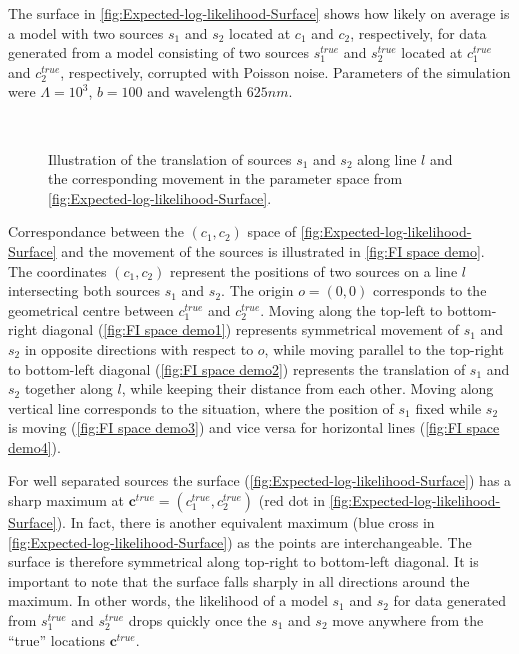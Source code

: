 The surface in \autoref{fig:Expected-log-likelihood-Surface} shows how likely on average is a model with two sources $s_1$ and $s_2$ located at $c_1$ and $c_2$, respectively, for data generated from a model consisting of two sources $s_1^{true}$ and $s_2^{true}$ located at $c_1^{true}$ and $c_2^{true}$, respectively, corrupted with Poisson noise. Parameters of the simulation were $\Lambda=10^3$, $b=100$ and wavelength $625 \unit{nm}$.

\begin{figure}[hb]
	\newcommand{\wf}{.48\textwidth}
	\centering
	 \\
	\caption{Illustration of the translation of sources $s_1$ and $s_2$ along line $l$ and the corresponding movement in the parameter space from \autoref{fig:Expected-log-likelihood-Surface}.}
	\label{fig:FI space demo}
\end{figure}
%
Correspondance between the $(c_1,c_2)$ space of \autoref{fig:Expected-log-likelihood-Surface} and the movement of the sources is illustrated in \autoref{fig:FI space demo}. The coordinates $(c_1,c_2)$ represent the positions of two sources on a line $l$ intersecting both sources $s_1$ and  $s_2$. The origin $o=(0,0)$ corresponds to the geometrical centre between $c_1^{true}$ and $c_2^{true}$. Moving along the top-left to bottom-right diagonal (\autoref{fig:FI space demo1}) represents symmetrical movement of $s_1$ and $s_2$  in opposite directions with respect to $o$, while moving parallel to the top-right to bottom-left diagonal (\autoref{fig:FI space demo2}) represents the translation of $s_1$ and $s_2$ together along $l$, while keeping their distance from each other. Moving along vertical line corresponds to the situation, where the position of $s_1$ fixed while $s_2$ is moving (\autoref{fig:FI space demo3}) and vice versa for horizontal lines (\autoref{fig:FI space demo4}).

For well separated sources the surface (\autoref{fig:Expected-log-likelihood-Surface}\aaa) has a sharp maximum at $\bm{c}^{true}=(c_1^{true},c_2^{true})$ (red dot in \autoref{fig:Expected-log-likelihood-Surface}\aaa). In fact, there is another equivalent maximum (blue cross in \autoref{fig:Expected-log-likelihood-Surface}\aaa) as the points are interchangeable.  The surface is therefore symmetrical along top-right to bottom-left diagonal. It is important to note that the surface falls sharply in all directions around the maximum. In other words, the likelihood of a model $s_1$ and $s_2$ for data generated from $s_1^{true}$ and $s_2^{true}$ drops quickly once the $s_1$ and $s_2$ move anywhere from the ``true'' locations $\bm{c}^{true}$.

